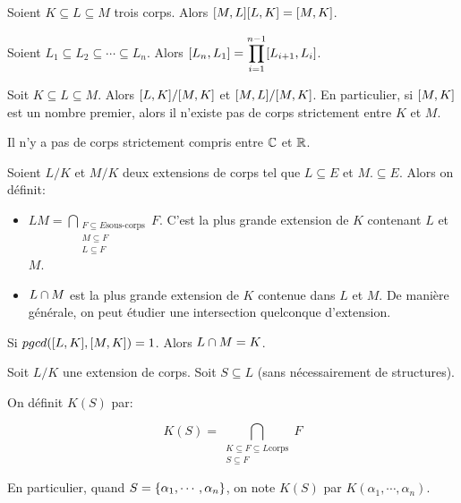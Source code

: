 \begin{proposition} 
	Soient $K \subseteq L \subseteq M$ trois corps. Alors
	$[M, L] [L, K] = [M, K]$.
\end{proposition}

\begin{proposition} 
	Soient $L_{1} \subseteq L_{2} \subseteq \cdots \subseteq L_{n}$.
	Alors $[L_{n}, L_{1}] =
	\displaystyle \prod_{i = 1}^{n - 1} [L_{i + 1}, L_{i}]$.
\end{proposition}

\begin{remarque}
	Soit $K \subseteq L \subseteq M$. Alors $[L, K] /
	[M, K]$ et $[M, L] /
	[M, K]$. En particulier, si $[M, K]$ est un
	nombre premier, alors il n'existe pas de corps strictement entre $K$ et $M$.
\end{remarque}

\begin{exercice}
	Il n'y a pas de corps strictement compris entre $\mathbb{C}$ et $\mathbb{R}$.
\end{exercice}

\begin{definition}
	Soient $L/K$ et $M/K$ deux extensions de corps tel que $L \subseteq E$ et $M
	.\subseteq E$. Alors on définit:

	\begin{itemize}
		\item $LM = \displaystyle \bigcap_{\substack{F \subseteq E
				\text{sous-corps} \\ M \subseteq F \\ L \subseteq F}}
	F$. C'est la plus grande extension de $K$ contenant $L$ et $M$.
		\item $L \cap M$ est la plus grande extension de $K$ contenue dans $L$
			et $M$. De manière générale, on peut étudier une intersection
			quelconque d'extension.
	\end{itemize}
\end{definition}

\begin{exercice}
	Si $pgcd([L, K], [M, K]) = 1$. Alors $L
	\cap M = K$.
\end{exercice}

\begin{definition}
	Soit $L/K$ une extension de corps. Soit $S \subseteq L$ (sans nécessairement
	de structures).

	On définit $K(S)$ par:

	\begin{equation*}
		K(S) = \displaystyle \bigcap_{\substack{K \subseteq F \subseteq L
			\text{corps} \\ S \subseteq F}} F
	\end{equation*}

	En particulier, quand $S = \left\{ \alpha_{1}, \cdots, \alpha_{n} \right\}$, on note
	$K(S)$ par $K(\alpha_{1}, \cdots, \alpha_{n})$.
\end{definition}

